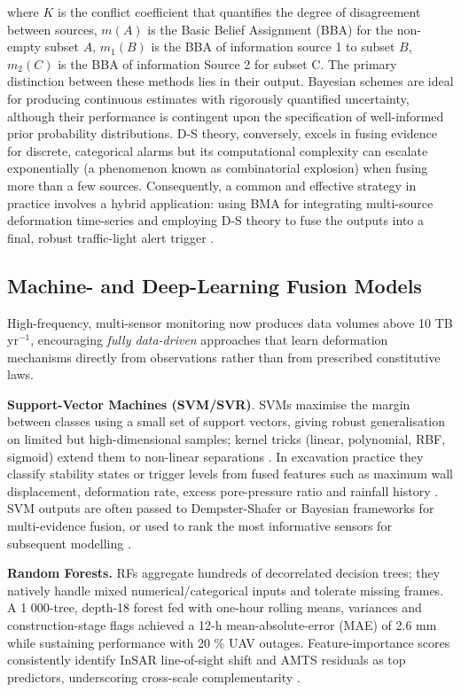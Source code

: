 \documentclass[preprint,11pt,authoryear,3p]{elsarticle}
\begin{document}
where $K$ is the conflict coefficient that quantifies the degree of disagreement between sources, $m(A)$ is the Basic Belief Assignment (BBA) for the non-empty subset $A$, $m_1(B)$ is the BBA of information source 1 to subset $B$, $m_2(C)$ is the BBA of information Source 2 for subset C. The primary distinction between these methods lies in their output. Bayesian schemes are ideal for producing continuous estimates with rigorously quantified uncertainty, although their performance is contingent upon the specification of well-informed prior probability distributions. D-S theory, conversely, excels in fusing evidence for discrete, categorical alarms but its computational complexity can escalate exponentially (a phenomenon known as combinatorial explosion) when fusing more than a few sources. Consequently, a common and effective strategy in practice involves a hybrid application: using BMA for integrating multi-source deformation time-series and employing D-S theory to fuse the outputs into a final, robust traffic-light alert trigger \citep{10833798}.


\subsection{Machine- and Deep-Learning Fusion Models}
\label{subsec:ml}

High-frequency, multi-sensor monitoring now produces data volumes above 10 TB yr$^{-1}$, encouraging \emph{fully data-driven} approaches that learn deformation mechanisms directly from observations rather than from prescribed constitutive laws.

\textbf{Support-Vector Machines (SVM/SVR)}. SVMs maximise the margin between classes using a small set of support vectors, giving robust generalisation on limited but high-dimensional samples; kernel tricks (linear, polynomial, RBF, sigmoid) extend them to non-linear separations \citep{Murphy2022Intro}. In excavation practice they classify stability states or trigger levels from fused features such as maximum wall displacement, deformation rate, excess pore-pressure ratio and rainfall history \citep{LI20231019,PAN2024109578}. SVM outputs are often passed to Dempster-Shafer or Bayesian frameworks for multi-evidence fusion, or used to rank the most informative sensors for subsequent modelling \citep{WU2024105516}.

\textbf{Random Forests.} RFs aggregate hundreds of decorrelated decision trees; they natively handle mixed numerical/categorical inputs and tolerate missing frames. A 1 000-tree, depth-18 forest fed with one-hour rolling means, variances and construction-stage flags achieved a 12-h mean-absolute-error (MAE) of 2.6 mm while sustaining performance with 20 \% UAV outages. Feature-importance scores consistently identify InSAR line-of-sight shift and AMTS residuals as top predictors, underscoring cross-scale complementarity \citep{PAN2024109578}.
\end{document}
